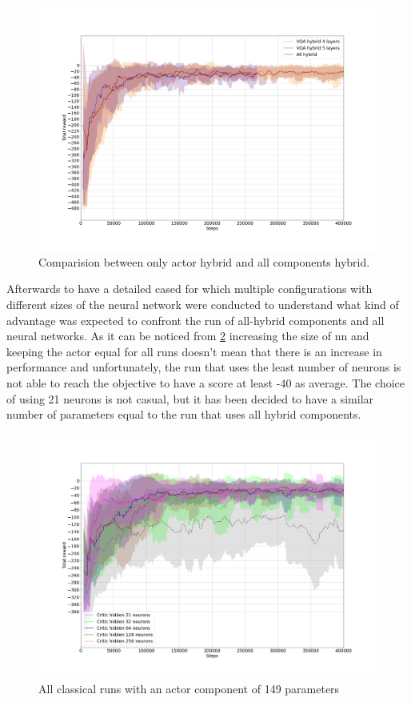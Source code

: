 \begin{figure}[H]
	\centering
	\includegraphics[width=1.0\linewidth]{"img/fully_vs_partial_quantum"}
	\caption{Comparision between only actor hybrid and all components hybrid.}
	\label{fig:fully_vs_partial_quantum}
\end{figure}
Afterwards to have a detailed cased for which multiple configurations with different sizes of the neural network were conducted to understand what kind of advantage was expected to confront the run of all-hybrid components and all neural networks. As it can be noticed from \ref{fig:all-classical-results} increasing the size of \acrlong{nn} and keeping the actor equal for all runs doesn't mean that there is an increase in performance and unfortunately, the run that uses the least number of neurons is not able to reach the objective to have a score at least -40 as average. The choice of using 21 neurons is not casual, but it has been decided to have a similar number of parameters equal to the run that uses all hybrid components.\\
\begin{figure}[H]
	\centering
	\includegraphics[width=0.95\linewidth]{"img/All classical results"}
	\caption{All classical runs with an actor component of 149 parameters}
	\label{fig:all-classical-results}
\end{figure}
